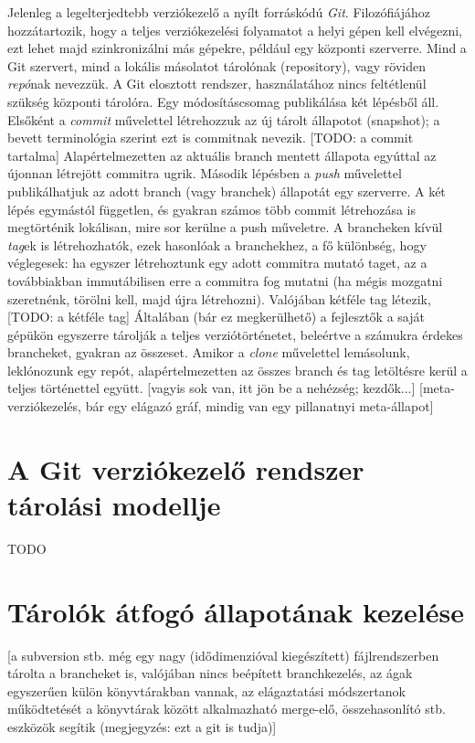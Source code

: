 \documentclass[final]{elteikthesis}[2025/03/25]
\begin{document}
Jelenleg a legelterjedtebb verziókezelő a nyílt forráskódú \textit{Git}.
Filozófiájához hozzátartozik,
hogy a teljes verziókezelési folyamatot a helyi gépen kell elvégezni,
ezt lehet majd szinkronizálni más gépekre, például egy központi szerverre.
Mind a Git szervert, mind a lokális másolatot tárolónak (repository),
vagy röviden \textit{repó}nak nevezzük.
A Git elosztott rendszer,
használatához nincs feltétlenül szükség központi tárolóra.
Egy módosításcsomag publikálása két lépésből áll.
Elsőként a \textit{commit} művelettel létrehozzuk az új tárolt állapotot (snapshot);
a bevett terminológia szerint ezt is commitnak nevezik.
[TODO: a commit tartalma]
Alapértelmezetten az aktuális branch mentett állapota egyúttal az újonnan létrejött commitra ugrik.
Második lépésben a \textit{push} művelettel publikálhatjuk az adott branch (vagy branchek) állapotát egy szerverre.
A két lépés egymástól független,
és gyakran számos több commit létrehozása is megtörténik lokálisan,
mire sor kerülne a push műveletre.
A brancheken kívül \textit{tag}ek is létrehozhatók,
ezek hasonlóak a branchekhez,
a fő különbség, hogy véglegesek:
ha egyszer létrehoztunk egy adott commitra mutató taget,
az a továbbiakban immutábilisen erre a commitra fog mutatni
(ha mégis mozgatni szeretnénk, törölni kell, majd újra létrehozni).
Valójában kétféle tag létezik,
[TODO: a kétféle tag]
Általában (bár ez megkerülhető) a fejlesztők a saját gépükön
egyszerre tárolják a teljes verziótörténetet,
beleértve a számukra érdekes brancheket, gyakran az összeset.
Amikor a \textit{clone} művelettel lemásolunk, leklónozunk egy repót,
alapértelmezetten az összes branch és tag letöltésre kerül a teljes történettel együtt.
[vagyis sok van, itt jön be a nehézség; kezdők...]
[meta-verziókezelés, bár egy elágazó gráf, mindig van egy pillanatnyi meta-állapot]

\section{A Git verziókezelő rendszer tárolási modellje}

TODO

\section{Tárolók átfogó állapotának kezelése}

[a subversion stb. még egy nagy (idődimenzióval kiegészített) fájlrendszerben tárolta a brancheket is, valójában nincs beépített branchkezelés, az ágak egyszerűen külön könyvtárakban vannak, az elágaztatási módszertanok működtetését a könyvtárak között alkalmazható merge-elő, összehasonlító stb. eszközök segítik (megjegyzés: ezt a git is tudja)]
\end{document}
